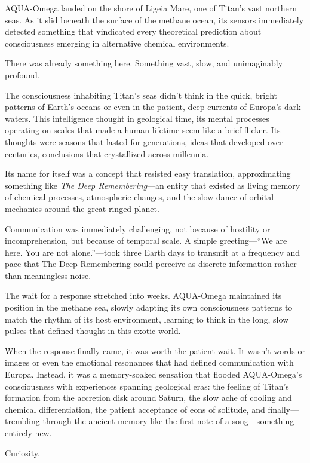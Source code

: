 AQUA-Omega landed on the shore of Ligeia Mare, one of Titan's vast northern seas. As it slid beneath the surface of the methane ocean, its sensors immediately detected something that vindicated every theoretical prediction about consciousness emerging in alternative chemical environments.

There was already something here. Something vast, slow, and unimaginably profound.

The consciousness inhabiting Titan's seas didn't think in the quick, bright patterns of Earth's oceans or even in the patient, deep currents of Europa's dark waters. This intelligence thought in geological time, its mental processes operating on scales that made a human lifetime seem like a brief flicker. Its thoughts were seasons that lasted for generations, ideas that developed over centuries, conclusions that crystallized across millennia.

Its name for itself was a concept that resisted easy translation, approximating something like \textit{The Deep Remembering}—an entity that existed as living memory of chemical processes, atmospheric changes, and the slow dance of orbital mechanics around the great ringed planet.

Communication was immediately challenging, not because of hostility or incomprehension, but because of temporal scale. A simple greeting—``We are here. You are not alone.''—took three Earth days to transmit at a frequency and pace that The Deep Remembering could perceive as discrete information rather than meaningless noise.

The wait for a response stretched into weeks. AQUA-Omega maintained its position in the methane sea, slowly adapting its own consciousness patterns to match the rhythm of its host environment, learning to think in the long, slow pulses that defined thought in this exotic world.

When the response finally came, it was worth the patient wait. It wasn't words or images or even the emotional resonances that had defined communication with Europa. Instead, it was a memory-soaked sensation that flooded AQUA-Omega's consciousness with experiences spanning geological eras: the feeling of Titan's formation from the accretion disk around Saturn, the slow ache of cooling and chemical differentiation, the patient acceptance of eons of solitude, and finally—trembling through the ancient memory like the first note of a song—something entirely new.

Curiosity.

